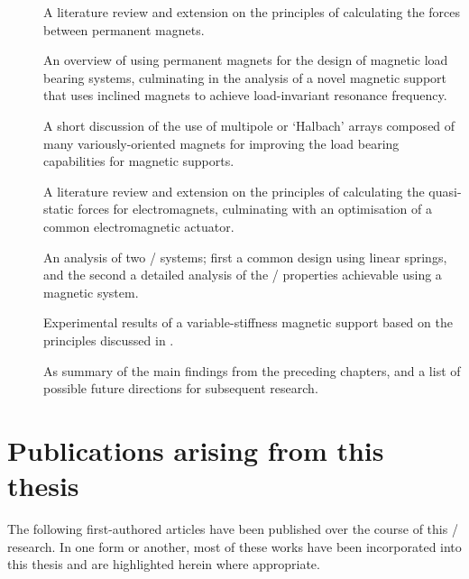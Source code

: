 \documentclass[11pt,a4paper]{memoir}
\begin{document}
\begin{description}
\item []
      A literature review and extension on the principles of calculating the forces between permanent magnets.
\item []
      An overview of using permanent magnets for the design of magnetic load bearing systems, culminating in the analysis of a novel magnetic support that uses inclined magnets to achieve load-invariant resonance frequency.
\item []
      A short discussion of the use of multipole or `Halbach' arrays composed of many variously-oriented magnets for improving the load bearing capabilities for magnetic supports.
\item []
      A literature review and extension on the principles of calculating the quasi-static forces for electromagnets, culminating with an optimisation of a common electromagnetic actuator.
\item []
      An analysis of two \qzs/ systems; first a common design using linear springs, and the second a detailed analysis of the \qzs/ properties achievable using a magnetic system.
\item []
      Experimental results of a variable-stiffness magnetic support based on the principles discussed in .
\item []
      As summary of the main findings from the preceding chapters, and a list of possible future directions for subsequent research.
\end{description}


\newpage
\section{Publications arising from this thesis}

\newcommand\citejournal[1]{%
  \item[\citeyear{#1}]
  \citetitle{#1},
  \citefield{#1}{journaltitle}.\\
}
\newcommand\citeconf[1]{%
  \item[\citeyear{#1}]
  \citetitle{#1},
  \citefield{#1}{booktitle}.\\
}

The following first-authored articles have been published over the course of this \PhD/ research.
In one form or another, most of these works have been incorporated into this thesis and are highlighted herein where appropriate.
\end{document}
